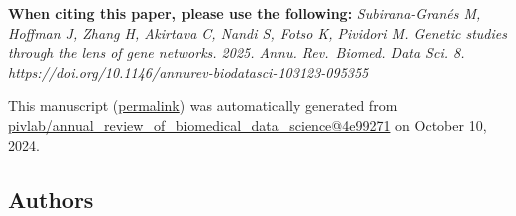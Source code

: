 { \textbf{When citing this paper, please use the following:}
\emph{Subirana-Granés M, Hoffman J, Zhang H, Akirtava C, Nandi S, Fotso K, Pividori M. Genetic studies through the lens of gene networks. 2025. Annu. Rev.~Biomed. Data Sci. 8. https://doi.org/10.1146/annurev-biodatasci-103123-095355}}

This manuscript
(\href{https://pivlab.github.io/annual_review_of_biomedical_data_science/v/4e9927114201ae1607c8d2e8ce90c7a85fe84773/}{permalink})
was automatically generated
from \href{https://github.com/pivlab/annual_review_of_biomedical_data_science/tree/4e9927114201ae1607c8d2e8ce90c7a85fe84773}{pivlab/annual\_review\_of\_biomedical\_data\_science@4e99271}
on October 10, 2024.

\hypertarget{authors}{%
\subsection{Authors}\label{authors}}

